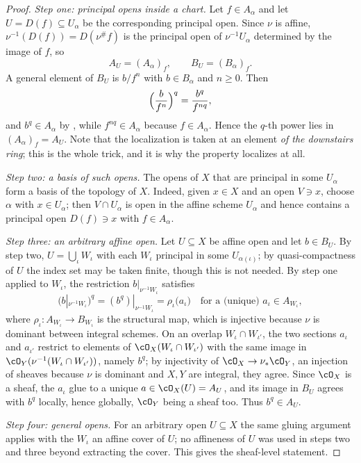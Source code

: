 \begin{proof}
\emph{Step one: principal opens inside a chart.}  Let $f\in A_\alpha$ and
let $U=D(f)\subseteq U_\alpha$ be the corresponding principal open.  Since
$\nu$ is affine, $\nu^{-1}(D(f))=D(\nu^\#f)$ is the principal open of
$\nu^{-1}U_\alpha$ determined by the image of $f$, so
\[
 A_U=(A_\alpha)_f,
 \qquad
 B_U=(B_\alpha)_f .
\]
A general element of $B_U$ is $b/f^n$ with $b\in B_\alpha$ and
$n\ge0$.  Then
\[
 \Bigl(\frac b{f^n}\Bigr)^q=\frac{b^q}{f^{nq}},
\]
and $b^q\in A_\alpha$ by , while
$f^{nq}\in A_\alpha$ because $f\in A_\alpha$.  Hence the $q$-th power
lies in $(A_\alpha)_f=A_U$.  Note that the localization is taken at an
element \emph{of the downstairs ring}; this is the whole trick, and it is
why the property localizes at all.

\emph{Step two: a basis of such opens.}  The opens of $X$ that are
principal in some $U_\alpha$ form a basis of the topology of $X$.
Indeed, given $x\in X$ and an open $V\ni x$, choose $\alpha$ with
$x\in U_\alpha$; then $V\cap U_\alpha$ is open in the affine scheme
$U_\alpha$ and hence contains a principal open $D(f)\ni x$ with
$f\in A_\alpha$.

\emph{Step three: an arbitrary affine open.}  Let $U\subseteq X$ be affine
open and let $b\in B_U$.  By step two, $U=\bigcup_\iota W_\iota$ with
each $W_\iota$ principal in some $U_{\alpha(\iota)}$; by
quasi-compactness of $U$ the index set may be taken finite, though this is
not needed.  By step one applied to $W_\iota$, the restriction
$b|_{\nu^{-1}W_\iota}$ satisfies
\[
 \bigl(b|_{\nu^{-1}W_\iota}\bigr)^q=(b^q)|_{\nu^{-1}W_\iota}
 =\rho_\iota\bigl(a_\iota\bigr)
 \quad\text{for a (unique) }a_\iota\in A_{W_\iota},
\]
where $\rho_\iota:A_{W_\iota}\to B_{W_\iota}$ is the structural map, which
is injective because $\nu$ is dominant between integral schemes.  On an
overlap $W_\iota\cap W_{\iota'}$, the two sections
$a_\iota$ and $a_{\iota'}$ restrict to elements of
$\cO_X(W_\iota\cap W_{\iota'})$ with the same image in
$\cO_Y(\nu^{-1}(W_\iota\cap W_{\iota'}))$, namely $b^q$; by injectivity
of $\cO_X\to\nu_*\cO_Y$, an injection of sheaves because $\nu$ is
dominant and $X,Y$ are integral, they agree.  Since $\cO_X$ is a sheaf,
the $a_\iota$ glue to a unique $a\in\cO_X(U)=A_U$, and its image in
$B_U$ agrees with $b^q$ locally, hence globally, $\cO_Y$ being a
sheaf too.  Thus $b^q\in A_U$.

\emph{Step four: general opens.}  For an arbitrary open $U\subseteq X$
the same gluing argument applies with the $W_\iota$ an affine cover of
$U$; no affineness of $U$ was used in steps two and three beyond
extracting the cover.  This gives the sheaf-level statement.
\end{proof}

